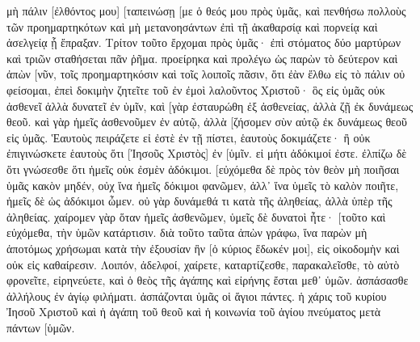 μὴ πάλιν [ἐλθόντος μου] [ταπεινώσῃ [με ὁ θεός μου πρὸς ὑμᾶς, καὶ πενθήσω πολλοὺς τῶν προημαρτηκότων καὶ μὴ μετανοησάντων ἐπὶ τῇ ἀκαθαρσίᾳ καὶ πορνείᾳ καὶ ἀσελγείᾳ ᾗ ἔπραξαν. 
Τρίτον τοῦτο ἔρχομαι πρὸς ὑμᾶς· ἐπὶ στόματος δύο μαρτύρων καὶ τριῶν σταθήσεται πᾶν ῥῆμα. 
προείρηκα καὶ προλέγω ὡς παρὼν τὸ δεύτερον καὶ ἀπὼν [νῦν, τοῖς προημαρτηκόσιν καὶ τοῖς λοιποῖς πᾶσιν, ὅτι ἐὰν ἔλθω εἰς τὸ πάλιν οὐ φείσομαι, 
ἐπεὶ δοκιμὴν ζητεῖτε τοῦ ἐν ἐμοὶ λαλοῦντος Χριστοῦ· ὃς εἰς ὑμᾶς οὐκ ἀσθενεῖ ἀλλὰ δυνατεῖ ἐν ὑμῖν, 
καὶ [γὰρ ἐσταυρώθη ἐξ ἀσθενείας, ἀλλὰ ζῇ ἐκ δυνάμεως θεοῦ. καὶ γὰρ ἡμεῖς ἀσθενοῦμεν ἐν αὐτῷ, ἀλλὰ [ζήσομεν σὺν αὐτῷ ἐκ δυνάμεως θεοῦ εἰς ὑμᾶς. 
Ἑαυτοὺς πειράζετε εἰ ἐστὲ ἐν τῇ πίστει, ἑαυτοὺς δοκιμάζετε· ἢ οὐκ ἐπιγινώσκετε ἑαυτοὺς ὅτι [Ἰησοῦς Χριστὸς] ἐν [ὑμῖν. εἰ μήτι ἀδόκιμοί ἐστε. 
ἐλπίζω δὲ ὅτι γνώσεσθε ὅτι ἡμεῖς οὐκ ἐσμὲν ἀδόκιμοι. 
[εὐχόμεθα δὲ πρὸς τὸν θεὸν μὴ ποιῆσαι ὑμᾶς κακὸν μηδέν, οὐχ ἵνα ἡμεῖς δόκιμοι φανῶμεν, ἀλλ᾽ ἵνα ὑμεῖς τὸ καλὸν ποιῆτε, ἡμεῖς δὲ ὡς ἀδόκιμοι ὦμεν. 
οὐ γὰρ δυνάμεθά τι κατὰ τῆς ἀληθείας, ἀλλὰ ὑπὲρ τῆς ἀληθείας. 
χαίρομεν γὰρ ὅταν ἡμεῖς ἀσθενῶμεν, ὑμεῖς δὲ δυνατοὶ ἦτε· [τοῦτο καὶ εὐχόμεθα, τὴν ὑμῶν κατάρτισιν. 
διὰ τοῦτο ταῦτα ἀπὼν γράφω, ἵνα παρὼν μὴ ἀποτόμως χρήσωμαι κατὰ τὴν ἐξουσίαν ἣν [ὁ κύριος ἔδωκέν μοι], εἰς οἰκοδομὴν καὶ οὐκ εἰς καθαίρεσιν. 
Λοιπόν, ἀδελφοί, χαίρετε, καταρτίζεσθε, παρακαλεῖσθε, τὸ αὐτὸ φρονεῖτε, εἰρηνεύετε, καὶ ὁ θεὸς τῆς ἀγάπης καὶ εἰρήνης ἔσται μεθ᾽ ὑμῶν. 
ἀσπάσασθε ἀλλήλους ἐν ἁγίῳ φιλήματι. ἀσπάζονται ὑμᾶς οἱ ἅγιοι πάντες. 
ἡ χάρις τοῦ κυρίου Ἰησοῦ Χριστοῦ καὶ ἡ ἀγάπη τοῦ θεοῦ καὶ ἡ κοινωνία τοῦ ἁγίου πνεύματος μετὰ πάντων [ὑμῶν. 
